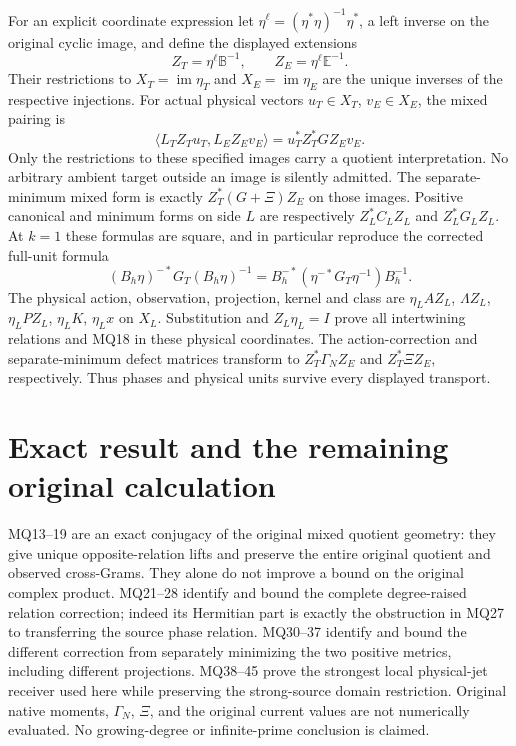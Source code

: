 \documentclass[11pt]{article}
\newcommand{\im}{\operatorname{im}}
\begin{document}
For an explicit coordinate expression let
$\eta^\ell=(\eta^*\eta)^{-1}\eta^*$, a left inverse on the
original cyclic image, and define the displayed extensions
\[
 Z_T=\eta^\ell\mathbb B^{-1},\qquad
 Z_E=\eta^\ell\mathbb E^{-1}.                               \tag{MQ43}
\]
Their restrictions to $X_T=\im\eta_T$ and $X_E=\im\eta_E$
are the unique inverses of the respective injections. For actual
physical vectors $u_T\in X_T$, $v_E\in X_E$, the mixed pairing is
\[
 \langle L_TZ_Tu_T,L_EZ_Ev_E\rangle
       =u_T^* Z_T^*G Z_Ev_E.                               \tag{MQ44}
\]
Only the restrictions to these specified images carry a quotient
interpretation. No arbitrary ambient target outside an image is
silently admitted. The separate-minimum mixed form is exactly
$Z_T^*(G+\Xi)Z_E$ on those images. Positive canonical and minimum
forms on side $L$ are respectively $Z_L^*C_LZ_L$ and
$Z_L^*G_LZ_L$. At $k=1$ these formulas are square, and in
particular reproduce the corrected full-unit formula
\[
 (B_h\eta)^{-*}G_T(B_h\eta)^{-1}
   =B_h^{-*}(\eta^{-*}G_T\eta^{-1})B_h^{-1}.                \tag{MQ45}
\]
The physical action, observation, projection, kernel and class are
$\eta_L A Z_L$, $\Lambda Z_L$, $\eta_LPZ_L$, $\eta_LK$,
$\eta_Lx$ on $X_L$. Substitution and $Z_L\eta_L=I$ prove
all intertwining relations and MQ18 in these physical coordinates.
The action-correction and separate-minimum defect matrices transform
to $Z_T^*\Gamma_NZ_E$ and $Z_T^*\Xi Z_E$, respectively.
Thus phases and physical units survive every displayed transport.

\section{Exact result and the remaining original calculation}
MQ13--19 are an exact conjugacy of the original mixed quotient
geometry: they give unique opposite-relation lifts and preserve the
entire original quotient and observed cross-Grams. They alone do
not improve a bound on the original complex product. MQ21--28
identify and bound the complete degree-raised relation correction;
indeed its Hermitian part is exactly the obstruction in MQ27 to
transferring the source phase relation. MQ30--37 identify and bound
the different correction from separately minimizing the two
positive metrics, including different projections. MQ38--45 prove
the strongest local physical-jet receiver used here while preserving
the strong-source domain restriction. Original native moments,
$\Gamma_N$, $\Xi$, and the original current values are not numerically
evaluated. No growing-degree or infinite-prime conclusion is claimed.
\end{document}
